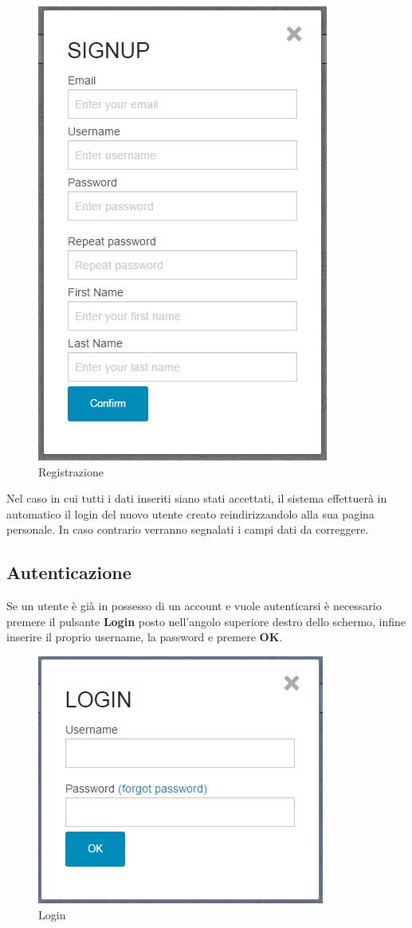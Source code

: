 \begin{figure}[H] 
	\centering 
	\includegraphics[scale=0.40] {img/signup}
	\caption{Registrazione} 
\end{figure}


\noindent Nel caso in cui tutti i dati inseriti siano stati accettati, il sistema effettuerà in automatico il login del nuovo utente creato reindirizzandolo alla sua pagina personale.
In caso contrario verranno segnalati i campi dati da correggere.

\subsection{Autenticazione}
Se un utente è già in possesso di un account e vuole autenticarsi è necessario premere il pulsante \textbf{Login} posto nell'angolo superiore destro dello schermo, infine inserire il proprio username, la password e premere \textbf{OK}.

\begin{figure}[h] 
	\centering 
	\includegraphics[scale=0.40] {img/login}
	\caption{Login} 
\end{figure}

